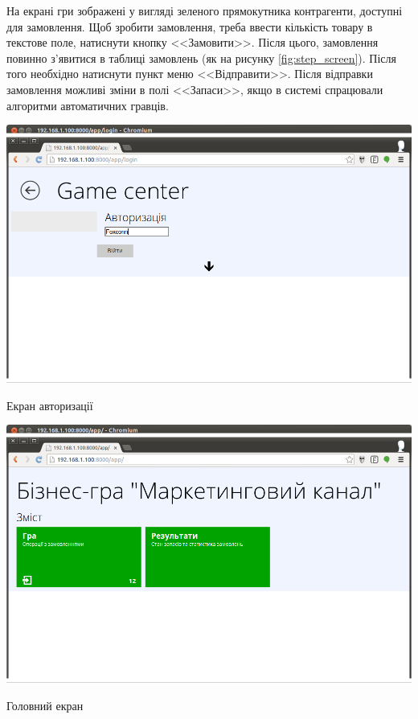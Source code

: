 На екрані гри зображені у вигляді зеленого прямокутника контрагенти, доступні для замовлення. Щоб зробити замовлення, треба ввести кількість товару в текстове поле, натиснути кнопку <<Замовити>>. Після цього, замовлення повинно з’явитися в таблиці замовлень (як на рисунку \ref{fig:step_screen}). Після того необхідно натиснути пункт меню <<Відправити>>. Після відправки замовлення можливі зміни в полі <<Запаси>>, якщо в системі спрацювали алгоритми автоматичних гравців.
\begin{stdfigure}
    \includegraphics[width=7in]{images/screen/login_screen.png}
    \caption{Екран авторизації}
    \label{fig:login_screen}
\end{stdfigure}   
\begin{stdfigure}
    \includegraphics[width=7in]{images/screen/main_screen.png}
    \caption{Головний екран}
    \label{fig:main_screen}
\end{stdfigure}
